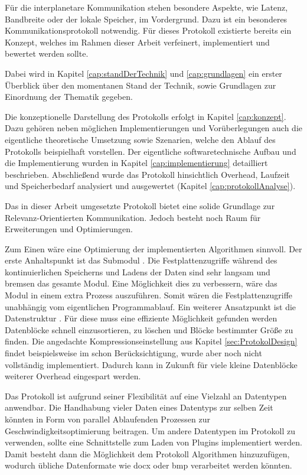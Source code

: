 Für die interplanetare Kommunikation stehen besondere Aspekte, wie Latenz,
Bandbreite oder der lokale Speicher, im Vordergrund. Dazu ist ein besonderes
Kommunikationsprotokoll notwendig. Für dieses Protokoll  existierte
bereits ein Konzept, welches im Rahmen dieser Arbeit verfeinert, implementiert
und bewertet werden sollte.

Dabei wird in Kapitel \ref{cap:standDerTechnik} und \ref{cap:grundlagen} ein
erster Überblick über den momentanen Stand der Technik, sowie Grundlagen zur
Einordnung der Thematik gegeben.

Die konzeptionelle Darstellung des Protokolls erfolgt in Kapitel
\ref{cap:konzept}. Dazu gehören neben möglichen Implementierungen und
Vorüberlegungen auch die eigentliche theoretische Umsetzung sowie Szenarien,
welche den Ablauf des Protokolls beispielhaft vorstellen. Der eigentliche
softwaretechnische Aufbau und die Implementierung wurden in Kapitel
\ref{cap:implementierung} detailliert beschrieben. Abschließend wurde das
Protokoll hinsichtlich Overhead, Laufzeit und Speicherbedarf analysiert und
ausgewertet (Kapitel \ref{cap:protokollAnalyse}).

Das in dieser Arbeit umgesetzte Protokoll bietet eine solide
Grundlage zur Relevanz-Orientierten Kommunikation. Jedoch besteht noch Raum
für Erweiterungen und Optimierungen.

Zum Einen wäre eine Optimierung der implementierten Algorithmen sinnvoll.
Der erste Anhaltspunkt ist das Submodul .
Die Festplattenzugriffe während des kontinuierlichen Speicherns und Ladens der Daten
sind sehr langsam und bremsen das gesamte Modul. Eine Möglichkeit dies zu
verbessern, wäre das Modul in einem extra Prozess auszuf{\"u}hren. Somit wären
die Festplattenzugriffe unabhängig vom eigentlichen Programmablauf. Ein
weiterer Ansatzpunkt ist die Datenstruktur . Für diese muss
eine effiziente Möglichkeit gefunden werden Datenblöcke schnell
einzusortieren, zu löschen und Bl{\"o}cke bestimmter Größe zu finden.
Die angedachte Kompressionseinstellung aus Kapitel \ref{sec:ProtokolDesign}
findet beispielsweise im  schon Berücksichtigung, wurde aber
noch nicht vollständig implementiert. Dadurch kann in Zukunft für viele kleine
Datenblöcke weiterer Overhead eingespart werden.

Das Protokoll ist aufgrund seiner Flexibilität auf eine Vielzahl an Datentypen
anwendbar. Die Handhabung vieler Daten eines Datentyps zur selben Zeit könnten
in Form von parallel Ablaufenden Prozessen zur Geschwindigkeitsoptimierung
beitragen. Um andere Datentypen im Protokoll zu verwenden, sollte eine
Schnittstelle zum Laden von Plugins implementiert werden. Damit besteht dann die
Möglichkeit dem Protokoll Algorithmen hinzuzufügen, wodurch
übliche Datenformate wie docx oder bmp verarbeitet werden k{\"o}nnten.

